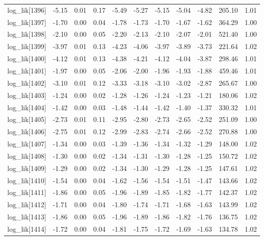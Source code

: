 \begin{table}[ht]
\begin{tabular}{rrrrrrrrrrr}
  log\_lik[1396] & -5.15 & 0.01 & 0.17 & -5.49 & -5.27 & -5.15 & -5.04 & -4.82 & 205.10 & 1.01 \\ 
  log\_lik[1397] & -1.70 & 0.00 & 0.04 & -1.78 & -1.73 & -1.70 & -1.67 & -1.62 & 364.29 & 1.00 \\ 
  log\_lik[1398] & -2.10 & 0.00 & 0.05 & -2.20 & -2.13 & -2.10 & -2.07 & -2.01 & 521.40 & 1.00 \\ 
  log\_lik[1399] & -3.97 & 0.01 & 0.13 & -4.23 & -4.06 & -3.97 & -3.89 & -3.73 & 221.64 & 1.02 \\ 
  log\_lik[1400] & -4.12 & 0.01 & 0.13 & -4.38 & -4.21 & -4.12 & -4.04 & -3.87 & 298.46 & 1.01 \\ 
  log\_lik[1401] & -1.97 & 0.00 & 0.05 & -2.06 & -2.00 & -1.96 & -1.93 & -1.88 & 459.46 & 1.01 \\ 
  log\_lik[1402] & -3.10 & 0.01 & 0.12 & -3.33 & -3.18 & -3.10 & -3.02 & -2.87 & 265.67 & 1.00 \\ 
  log\_lik[1403] & -1.24 & 0.00 & 0.02 & -1.28 & -1.26 & -1.24 & -1.23 & -1.21 & 180.06 & 1.02 \\ 
  log\_lik[1404] & -1.42 & 0.00 & 0.03 & -1.48 & -1.44 & -1.42 & -1.40 & -1.37 & 330.32 & 1.01 \\ 
  log\_lik[1405] & -2.73 & 0.01 & 0.11 & -2.95 & -2.80 & -2.73 & -2.65 & -2.52 & 251.09 & 1.00 \\ 
  log\_lik[1406] & -2.75 & 0.01 & 0.12 & -2.99 & -2.83 & -2.74 & -2.66 & -2.52 & 270.88 & 1.00 \\ 
  log\_lik[1407] & -1.34 & 0.00 & 0.03 & -1.39 & -1.36 & -1.34 & -1.32 & -1.29 & 148.00 & 1.02 \\ 
  log\_lik[1408] & -1.30 & 0.00 & 0.02 & -1.34 & -1.31 & -1.30 & -1.28 & -1.25 & 150.72 & 1.02 \\ 
  log\_lik[1409] & -1.29 & 0.00 & 0.02 & -1.34 & -1.30 & -1.29 & -1.28 & -1.25 & 147.61 & 1.02 \\ 
  log\_lik[1410] & -1.54 & 0.00 & 0.04 & -1.62 & -1.56 & -1.54 & -1.51 & -1.47 & 143.66 & 1.02 \\ 
  log\_lik[1411] & -1.86 & 0.00 & 0.05 & -1.96 & -1.89 & -1.85 & -1.82 & -1.77 & 142.37 & 1.02 \\ 
  log\_lik[1412] & -1.71 & 0.00 & 0.04 & -1.80 & -1.74 & -1.71 & -1.68 & -1.63 & 143.99 & 1.02 \\ 
  log\_lik[1413] & -1.86 & 0.00 & 0.05 & -1.96 & -1.89 & -1.86 & -1.82 & -1.76 & 136.75 & 1.02 \\ 
  log\_lik[1414] & -1.72 & 0.00 & 0.04 & -1.81 & -1.75 & -1.72 & -1.69 & -1.63 & 134.78 & 1.02 \\ 

\end{tabular}
\end{table}
